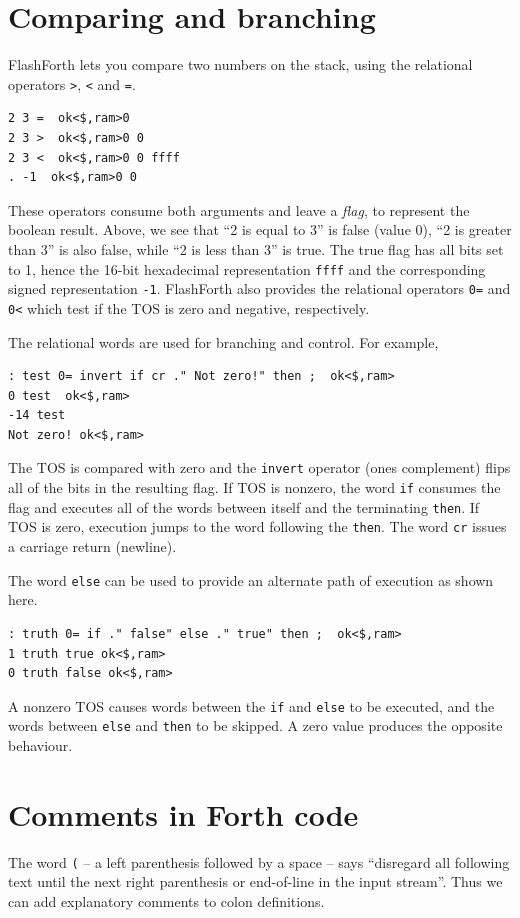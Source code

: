 \documentclass[12pt,a4paper]{article}
\begin{document}
\bigskip
\section{Comparing and branching}
\label{sec:comparing-branching}
%
FlashForth lets you compare two numbers on the stack, using the relational
operators \verb!>!, \verb!<! and \verb!=!.
\begin{verbatim}
2 3 =  ok<$,ram>0 
2 3 >  ok<$,ram>0 0 
2 3 <  ok<$,ram>0 0 ffff 
. -1  ok<$,ram>0 0 
\end{verbatim}
These operators consume both arguments and leave a \textit{flag}, 
to represent the boolean result.
Above, we see that ``2 is equal to 3'' is false (value 0),
``2 is greater than 3'' is also false, while
``2 is less than 3'' is true.
The true flag has all bits set to 1, hence the 16-bit hexadecimal representation \verb!ffff!
and the corresponding signed representation \verb!-1!.
FlashForth also provides the relational operators \verb!0=! and \verb!0<!
which test if the TOS is zero and negative, respectively.

\medskip
The relational words are used for branching and control.
For example,
\begin{verbatim}
: test 0= invert if cr ." Not zero!" then ;  ok<$,ram>
0 test  ok<$,ram>
-14 test 
Not zero! ok<$,ram>
\end{verbatim}
The TOS is compared with zero and the \verb!invert! operator (ones complement) flips
all of the bits in the resulting flag.
If TOS is nonzero, the word \verb!if! consumes the flag and executes all of the words
between itself and the terminating \verb!then!.
If TOS is zero, execution jumps to the word following the \verb!then!.
The word \verb!cr! issues a carriage return (newline).

\medskip
The word \verb!else! can be used to provide an alternate path of execution as shown here.
\begin{verbatim}
: truth 0= if ." false" else ." true" then ;  ok<$,ram>
1 truth true ok<$,ram>
0 truth false ok<$,ram>
\end{verbatim}
A nonzero TOS causes words between the \verb!if! and \verb!else! to be executed,
and the words between \verb!else! and \verb!then! to be skipped.
A zero value produces the opposite behaviour.


\bigskip
\section{Comments in Forth code}
\label{sec:commenting}
%
The word \verb!(! -- a left parenthesis followed by a space -- 
says ``disregard all following text until the next right parenthesis 
or end-of-line in the input stream''.
Thus we can add explanatory comments to colon definitions.
\end{document}
